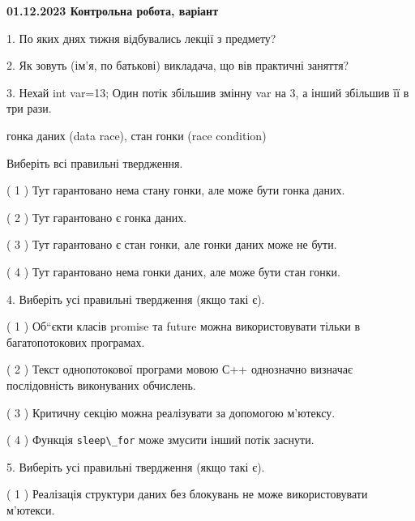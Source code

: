 \documentclass[12pt, ukrainian]{article}
\def\code#1{\Verb!#1!}
\begin{document}
\vspace{4mm}
\newpage
\begin {large}

\textbf{01.12.2023 Контрольна робота, варіант  }\par


{
1. По яких днях тижня відбувались лекції з предмету?



\vspace{5mm}
2. Як зовуть (ім'я, по батькові) викладача, що вів практичні заняття?



\vspace{5mm}
3. Нехай int var=13; Один потік збільшив змінну var на 3, а інший збільшив її в три рази.

гонка даних (data race), стан гонки (race condition)

Виберіть всі правильні твердження.\par
\vspace{2mm}
( 1 ) Тут гарантовано нема стану гонки, але може бути гонка даних.%

( 2 ) Тут гарантовано є гонка даних.%

( 3 ) Тут гарантовано є стан гонки, але гонки даних може не бути.%

( 4 ) Тут гарантовано нема гонки даних, але може бути стан гонки.%


\vspace{5mm}
4. Виберіть усі правильні твердження (якщо такі є).\par
\vspace{2mm}

( 1 ) Об“єкти класів promise та future можна використовувати тільки в багатопотокових програмах.%

( 2 ) Текст однопотокової програми мовою С++ однозначно визначає послідовність виконуваних обчислень.%

( 3 ) Критичну секцію можна реалізувати за допомогою м’ютексу.%

( 4 ) Функція \code{sleep\_for} може змусити інший потік заснути.%


\vspace{5mm}
5. Виберіть усі правильні твердження (якщо такі є).\par
\vspace{2mm}

( 1 ) Реалізація структури даних без блокувань не може використовувати м’ютекси.%

}
\end{large}
\end{document}
